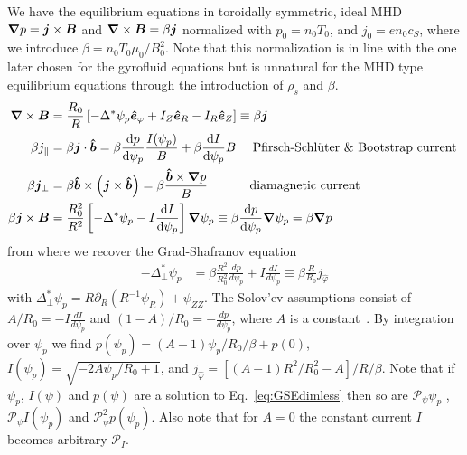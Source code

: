 We have the equilibrium equations in toroidally symmetric, ideal MHD
${\boldsymbol{\nabla}} p = {\boldsymbol{j}}\times {\boldsymbol{B}}$ and ${\boldsymbol{\nabla}}\times{\boldsymbol{B}} = \beta {\boldsymbol{j}}$ normalized with $p_0 = n_0 T_0$, and $j_0 = e n_0 c_S$, where we introduce $\beta = n_0 T_0 \mu_0 /B_0^2$.
Note that this normalization is in line with the one later chosen for the gyrofluid
equations but is unnatural for the MHD type equilibrium equations through the introduction
of $\rho_s$ and $\beta$.
\begin{align}
    {\boldsymbol{\nabla}}\times {\boldsymbol{B}} &= \frac{R_0}{R}\left[ -\Delta^*\psi_p\bm{\hat{e}}_\varphi + I_Z \bm{\hat{e}}_R - I_R\bm{\hat{e}}_Z \right]\equiv \beta {\boldsymbol{j}}\\
 \beta j_\parallel &= \beta {\boldsymbol{j}}\cdot \bm{\hat{b}} = \beta \frac{\mathrm{d} p}{\mathrm{d}\psi_p} \frac{I(\psi_p)}{B} +
 \beta\frac{\mathrm{d} I}{\mathrm{d}\psi_p} B \quad \text{  Pfirsch-Schl\"uter \& Bootstrap current } \\
 \beta {\boldsymbol{j}}_\perp &= \beta \bm{\hat{b}}\times\left({\boldsymbol{j}}\times\bm{\hat{b}}\right)=
 \beta \frac{\bm{\hat{b}} \times {\boldsymbol{\nabla}} p}{B} \quad\quad\quad \text{ diamagnetic current} \\
 \beta {\boldsymbol{j}}\times{\boldsymbol{B}} &= \frac{R_0^2}{R^2}\left[ -\Delta^* \psi_p - I
     \frac{\mathrm{d} I}{\mathrm{d} \psi_p} \right]{\boldsymbol{\nabla}}\psi_p \equiv \beta \frac{\mathrm{d} p}{\mathrm{d}\psi_p}{\boldsymbol{\nabla}}\psi_p =\beta {\boldsymbol{\nabla}} p
\end{align}
from where we recover the Grad-Shafranov equation
\begin{align}\label{eq:GSEdimless}
    -\Delta^*_\perp  \psi_p &= \beta \frac{R^2}{R_0^2} \frac{d p}{d  \psi_p } + I \frac{d I}{d  \psi_p } \equiv \beta \frac{R}{R_0} j_{\hat\varphi}
\end{align}
with $\Delta^*_\perp \psi_p = R\partial_R (R^{-1}\psi_R) + \psi_{ZZ}$.
The Solov'ev assumptions consist of \(A/R_0 = -I \frac{d I}{d  \psi_p }\) and \((1-A)/R_0 = -\frac{d p}{d  \psi_p }\), where \(A\) is a constant~\cite{Cerfon2010,Cerfon2014}.
By integration over \(\psi_p\) we find
$
p(\psi_p) = (A-1)\psi_p/R_0/\beta + p(0)$, %
 $I(\psi_p) = \sqrt{-2 A \psi_p/R_0 + 1}$,
 and
    $j_{\hat\varphi} = \left[(A-1)R^2/R_0^2 - A \right]/R/\beta $.
Note that if $\psi_p$, $I(\psi)$ and $p(\psi)$ are a solution to Eq.~\eqref{eq:GSEdimless}
then so are $\mathcal P_\psi \psi_p$ , $\mathcal P_\psi I(\psi_p)$ and $\mathcal P_\psi^2 p(\psi_p)$.
Also note that for $A=0$ the constant current $I$ becomes arbitrary $\mathcal P_I$.

